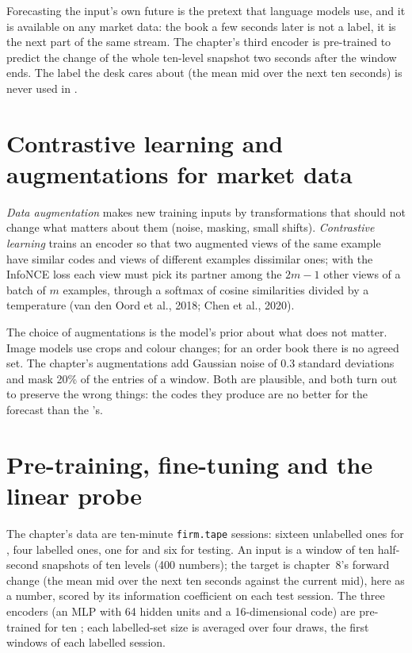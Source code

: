 Forecasting the input's own future is the pretext that language models use, and it is available on any market data:
the book a few seconds later is not a label, it is the next part of the same stream. The chapter's third encoder is
pre-trained to predict the change of the whole ten-level snapshot two seconds after the window ends. The label the desk
cares about (the mean mid over the next ten seconds) is never used in .

\section{Contrastive learning and augmentations for market data}

\begin{definition}\label{def:ml:representation-learning:contrastive}
\emph{Data augmentation} makes new training inputs by transformations that should not change
what matters about them (noise, masking, small shifts). \emph{Contrastive learning} trains an
encoder so that two augmented views of the same example have similar codes and views of different examples dissimilar
ones; with the InfoNCE loss each view must pick its partner among the $2m - 1$ other views of a batch of $m$ examples,
through a softmax of cosine similarities divided by a temperature (van den Oord et al., 2018; Chen et al., 2020).
\end{definition}

The choice of augmentations is the model's prior about what does not matter. Image models use crops and colour changes;
for an order book there is no agreed set. The chapter's augmentations add Gaussian noise of 0.3 standard deviations and
mask 20\% of the entries of a window. Both are plausible, and both turn out to preserve the wrong things: the codes they
produce are no better for the forecast than the 's.

\section{Pre-training, fine-tuning and the linear probe}

The chapter's data are ten-minute \texttt{firm.tape} sessions: sixteen unlabelled ones for , four labelled
ones, one for  and six for testing. An input is a window of ten half-second snapshots of ten levels (400
numbers); the target is chapter~8's forward change (the mean mid over the next ten seconds against the current mid),
here as a number, scored by its information coefficient on each test session. The three encoders (an MLP with 64
hidden units and a 16-dimensional code) are pre-trained for ten ; each labelled-set size is averaged over four
draws, the first windows of each labelled session.

